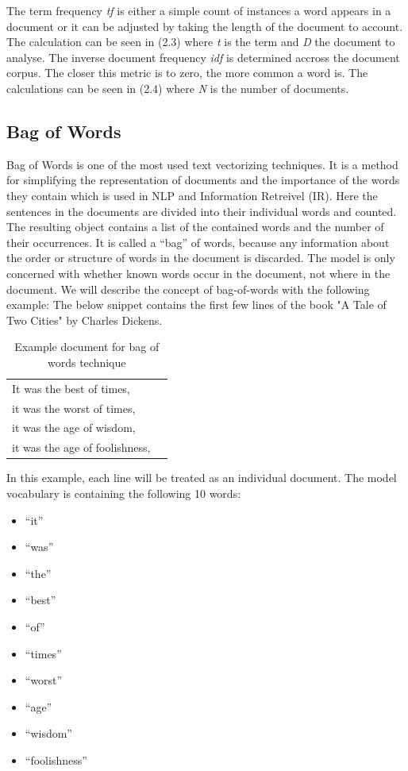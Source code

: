 The term frequency \textit{tf} is either a simple count of instances a word appears in a document or it can be adjusted by taking the length of the document to account. The calculation can be seen in (2.3) where \textit{t} is the term and \textit{D} the document to analyse. The inverse document frequency \textit{idf} is determined accross the document corpus. The closer this metric is to zero, the more common a word is. The calculations can be seen in (2.4) where \textit{N} is the number of documents.

\subsection{Bag of Words}
Bag of Words is one of the most used text vectorizing techniques. It is a method for simplifying the representation of documents and the importance of the words they contain which is used in NLP and Information Retreivel (IR). Here the sentences in the documents are divided into their individual words and counted. The resulting object contains a list of the contained words and the number of their occurrences. It is called a “bag” of words, because any information about the order or structure of words in the document is discarded. The model is only concerned with whether known words occur in the document, not where in the document. We will describe the concept of bag-of-words with the following example: The below snippet contains the first few lines of the book "A Tale of Two Cities" by Charles Dickens.

\begin{table}[H]
	\centering
	\begin{tabular}{ll}
		\hline
			It was the best of times,\\
			it was the worst of times,\\
			it was the age of wisdom,\\
			it was the age of foolishness, \\
		 \hline
	\end{tabular}
	\caption{Example document for bag of words technique}
	\label{tab:bow}
\end{table}

In this example, each line will be treated as an individual document. The model vocabulary is containing the following 10 words:
\begin{itemize}
	\item “it”
	\item “was”
	\item “the”
	\item “best”
	\item “of”
	\item “times”
	\item “worst”
	\item “age”
	\item “wisdom”
	\item “foolishness”
\end{itemize}

